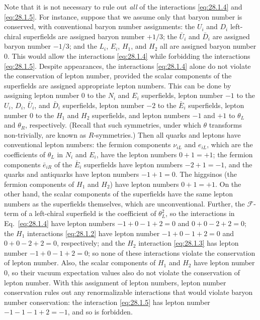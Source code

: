Note that it is not necessary to rule out \textit{all} of the
interactions \eqref{eq:28.1.4} and \eqref{eq:28.1.5}. For instance,
suppose that we assume only that baryon number is conserved, with
conventional baryon number assignments: the \(U_i\) and \(D_i\)
left-chiral superfields are assigned baryon number \(+1/3\); the
\(\bar U_i\) and \(\bar D_i\) are assigned baryon number \(-1/3\); and
the \(L_i\), \(E_i\), \(H_1\), and \(H_2\) all are assigned baryon
number 0. This would allow the interactions \eqref{eq:28.1.4} while
forbidding the interactions \eqref{eq:28.1.5}. Despite appearances, the
interactions \eqref{eq:28.1.4} alone do not violate the conservation of
lepton number, provided the scalar components of the superfields are
assigned appropriate lepton numbers. This can be done by assigning
lepton number 0 to the \(N_i\) and \(E_i\) superfields, lepton number
\(-1\) to the \(U_i\), \(D_i\), \(\bar U_i\), and \(\bar D_i\)
superfields, lepton number \(-2\) to the \(\bar E_i\) superfields,
lepton number 0 to the \(H_1\) and \(H_2\) superfields, and lepton
numbers \(-1\) and \(+1\) to \(\theta_L\) and \(\theta_R\),
respectively. (Recall that such symmetries, under which \(\theta\)
transforms non-trivially, are known as \(R\)-symmetries.) Then all quarks
and leptons have conventional lepton numbers: the fermion components
\(\nu_{iL}\) and \(e_{iL}\), which are the coefficients of \(\theta_L\)
in \(N_i\) and \(E_i\), have the lepton numbers \(0+1=+1\); the fermion
components \(\bar e_{iR}\) of the \(\bar E_i\) superfields have lepton
numbers \(-2+1=-1\), and the quarks and antiquarks have lepton numbers
\(-1+1=0\). The higgsinos (the fermion components of \(H_1\) and
\(H_2\)) have lepton numbers \(0+1=+1\). On the other hand, the scalar
components of the superfields have the same lepton numbers as the
superfields themselves, which are unconventional. Further, the
\(\mathcal{F}\)-term of a left-chiral superfield is the coefficient of
\(\theta_L^2\), so the interactions in Eq.~\eqref{eq:28.1.4} have
lepton numbers \(-1+0-1+2=0\) and \(0+0-2+2=0\); the \(H_1\)
interactions \eqref{eq:28.1.2} have lepton number
\(-1+0-1+2=0\) and \(0+0-2+2=0\), respectively; and the \(H_2\)
interaction \eqref{eq:28.1.3} has lepton number
\(-1+0-1+2=0\); so none of these interactions violate the conservation
of lepton number. Also, the scalar components of \(H_1\) and \(H_2\)
have lepton number 0, so their vacuum expectation values also do not
violate the conservation of lepton number. With this assignment of
lepton numbers, lepton number conservation rules out any renormalizable
interactions that would violate baryon number conservation: the
interaction \eqref{eq:28.1.5} has lepton number
\(-1-1-1+2=-1\), and so is forbidden.

